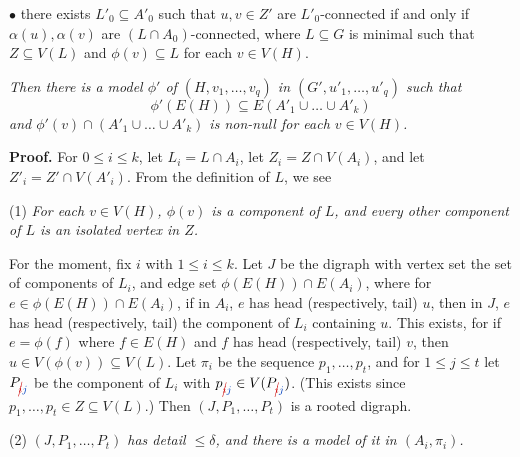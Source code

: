 \hspace*{12pt}$\bullet$ there exists $L'_0 \subseteq A'_0$ such that $u, v \in Z'$ are $L'_0$-connected if and only if $\alpha(u), \alpha(v)$ are $(L \cap A_0)$-connected, where $L \subseteq G$ is minimal such that $Z \subseteq V(L)$ and $\phi(v) \subseteq L$ for each $v \in V(H)$.

\textit{Then there is a model $\phi'$ of $(H, v_1, \ldots, v_q)$ in $(G', u'_1, \ldots, u'_q)$ such that}
\begin{equation*}
\phi'(E(H)) \subseteq E(A'_1 \cup \dots \cup A'_k)
\end{equation*}
\textit{and $\phi'(v) \cap (A'_1 \cup \dots \cup A'_k)$ is non-null for each $v \in V(H)$.}

\textbf{Proof.} For $0 \le i \le k$, let $L_i = L \cap A_i$, let $Z_i = Z \cap V(A_i)$, and let $Z'_i = Z' \cap V(A'_i)$. From the definition of $L$, we see

\hspace*{12pt}(1) \textit{For each $v \in V(H)$, $\phi(v)$ is a component of $L$, and every other component of $L$ is an isolated vertex in $Z$.}

For the moment, fix $i$ with $1 \le i \le k$. Let $J$ be the digraph with vertex set the set of components of $L_i$, and edge set $\phi(E(H)) \cap E(A_i)$, where for $e \in \phi(E(H)) \cap E(A_i)$, if in $A_i$, $e$ has head (respectively, tail) $u$, then in $J$, $e$ has head (respectively, tail) the component of $L_i$ containing $u$. This exists, for if $e = \phi(f)$ where $f \in E(H)$ and $f$ has head (respectively, tail) $v$, then $u \in V(\phi(v)) \subseteq V(L)$. Let $\pi_i$ be the sequence $p_1, \ldots, p_t$, and for $1 \le j \le t$ let $P_{\delm{i}\fix{j}}$ be the component of $L_i$ with $p_{\delm{i}\fix{j}} \in V(P_{\delm{i}\fix{j}})$. (This exists since $p_1, \ldots, p_t \in Z \subseteq V(L)$.) Then $(J, P_1, \ldots, P_t)$ is a rooted digraph.

\hspace*{12pt}(2) \textit{$(J, P_1, \ldots, P_t)$ has detail $\le \delta$, and there is a model of it in $(A_i, \pi_i)$.}

